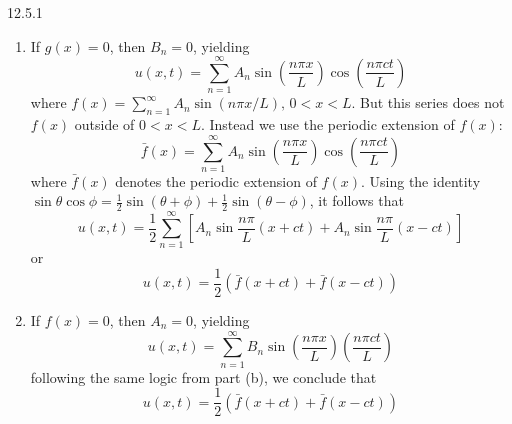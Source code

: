\documentclass{article}
\theoremstyle{definition}
\begin{document}
\begin{prob}{12.5.1}
\begin{enumerate}[label=\alph*.)]
    		\item If $ g(x) = 0 $, then $ B_n=0 $, yielding
    			\[ u(x,t) = \sum\limits_{n=1}^{\infty} A_n \sin\left( \frac{n\pi x}{L} \right) \cos\left( \frac{n\pi ct}{L} \right) \]
    			where $ f(x) = \sum_{n=1}^{\infty} A_n \sin(n\pi x/L), \, 0<x<L $. But this series does not $ f(x) $ outside of $ 0<x<L $. Instead we use the periodic extension of $ f(x) $:
    			\[ \bar{f}(x) = \sum\limits_{n=1}^{\infty} A_n \sin\left( \frac{n\pi x}{L} \right) \cos\left( \frac{n\pi ct}{L} \right) \]
    			where $ \bar{f}(x) $ denotes the periodic extension of $ f(x) $. Using the identity $ \sin\theta\cos\phi = \frac{1}{2}\sin(\theta+\phi) + \frac{1}{2} \sin(\theta-\phi) $, it follows that 
    			\[ u(x,t) = \frac{1}{2} \sum\limits_{n=1}^{\infty} \left[ A_n\sin\frac{n\pi}{L}(x+ct) + A_n\sin\frac{n\pi}{L}(x-ct) \right] \]
    			or
    			\[ \boxed{u(x,t) = \frac{1}{2}(\bar{f}(x+ct) + \bar{f}(x-ct)) } \]
    			
    		\item If $ f(x) = 0 $, then $ A_n = 0 $, yielding
    			\[ u(x,t) = \sum\limits_{n=1}^{\infty} B_n \sin\left( \frac{n\pi x}{L} \right) \left( \frac{n\pi ct}{L} \right) \]
    			following the same logic from part (b), we conclude that 
    			\[ \boxed{u(x,t) = \frac{1}{2}(\bar{f}(x+ct) + \bar{f}(x-ct)) } \]
    	\end{enumerate}
    \end{prob}
    
    
    
    
    
    
    
    
    
    
    
    
\end{document}
